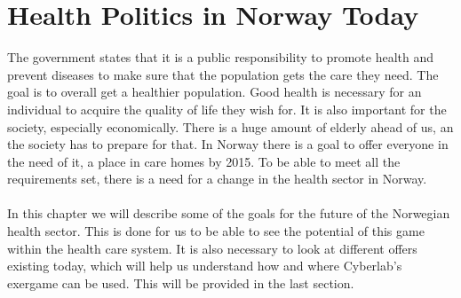 \chapter{Health Politics in Norway Today}
The government states that it is a public responsibility to promote health and prevent diseases to make sure that the population gets the care they need. The goal is to overall get a healthier population. Good health is necessary for an individual to acquire the quality of life they wish for. It is also important for the society, especially economically. There is a huge amount of elderly ahead of us, an the society has to prepare for that. In Norway there is a goal to offer everyone in the need of it, a place in care homes by 2015.  To be able to meet all the requirements set, there is a need for a change in the health sector in Norway.\\ \\
In this chapter we will describe some of the goals for the future of the Norwegian health sector. This is done for us to be able to see the potential of this game within the health care system.  It is also necessary to look at different offers existing today, which will help us understand how and where Cyberlab's exergame can be used. This will be provided in the last section. 

